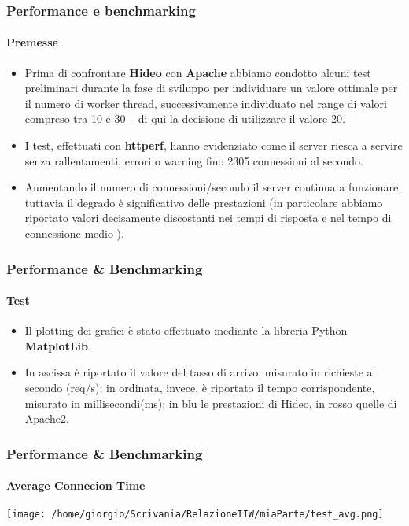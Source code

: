 \documentclass{beamer}
\begin{document}
\begin{frame}
\frametitle{Performance e benchmarking}
\framesubtitle{Premesse}

\begin{itemize}
\item Prima di confrontare \textbf{Hideo} con \textbf{Apache} abbiamo condotto alcuni test preliminari
durante la fase di sviluppo per individuare un valore ottimale per il numero di
worker thread, successivamente individuato nel range di valori compreso tra 10 e
30 – di qui la decisione di utilizzare il valore 20.

\item I test, effettuati con \textbf{httperf}, hanno evidenziato come il server riesca a servire
senza rallentamenti, errori o warning fino 2305 connessioni al secondo.

\item Aumentando il numero di connessioni/secondo il server continua a funzionare,
tuttavia il degrado è significativo delle prestazioni (in particolare abbiamo
riportato valori decisamente discostanti nei tempi di risposta e nel tempo di
connessione medio ).
\end{itemize}
\end{frame}




\begin{frame}
\frametitle{Performance \& Benchmarking}
\framesubtitle{Test}

\begin{itemize}
\item Il plotting dei grafici è stato effettuato mediante la libreria Python \textbf{MatplotLib}.
\item In ascissa è riportato il valore del tasso di arrivo, misurato in richieste al secondo
(req/s); in ordinata, invece, è riportato il tempo corrispondente, misurato in
millisecondi(ms); in blu le prestazioni di Hideo, in rosso quelle di Apache2.
\end{itemize}

\end{frame}

\begin{frame}
\frametitle{Performance \& Benchmarking}
\framesubtitle{Average Connecion Time}
\begin{center}


\texttt{[image: /home/giorgio/Scrivania/RelazioneIIW/miaParte/test\_avg.png]}
\end{center}
\end{frame}
\end{document}
